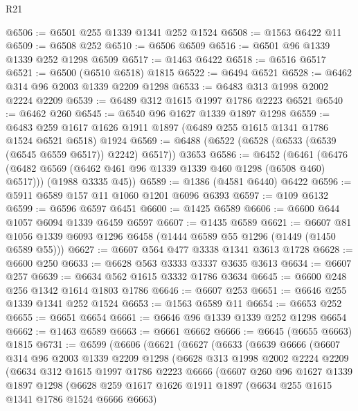 \begin{lexlean}{R21}
\begin{coremodule}
@6506 := @6501 @255 @1339 @1341 @252 @1524
@6508 := @1563 @6422 @11
@6509 := @6508 @252
@6510 := @6506 @6509
@6516 := @6501 @96 @1339 @1339 @252 @1298 @6509
@6517 := @1463 @6422
@6518 := @6516 @6517
@6521 := @6500 (@6510 @6518) @1815
@6522 := @6494 @6521
@6528 := @6462 @314 @96 @2003 @1339 @2209 @1298
@6533 := @6483 @313 @1998 @2002 @2224 @2209
@6539 := @6489 @312 @1615 @1997 @1786 @2223 @6521
@6540 := @6462 @260
@6545 := @6540 @96 @1627 @1339 @1897 @1298
@6559 := @6483 @259 @1617 @1626 @1911 @1897 (@6489 @255 @1615 @1341 @1786 @1524 @6521 @6518) @1924
@6569 := @6488 (@6522 (@6528 (@6533 (@6539 (@6545 @6559 @6517)) @2242) @6517)) @3653
@6586 := @6452
    (@6461
      (@6476 (@6482 @6569 (@6462 @461 @96 @1339 @1339 @460 @1298 (@6508 @460) @6517)))
      (@1988 @3335 @45))
@6589 := @1386 (@4581 @6440) @6422
@6596 := @5911 @6589 @157 @11 @1060 @1201 @6096 @6393
@6597 := @109 @6132
@6599 := @6596 @6597 @6451
@6600 := @1425 @6589
@6606 := @6600 @644 @1057 @6094 @1339 @6459 @6597
@6607 := @1435 @6589
@6621 := @6607 @81 @1056 @1339 @6093 @1296 @6458 (@1444 @6589 @55 @1296 (@1449 (@1450 @6589 @55)))
@6627 := @6607 @564 @477 @3338 @1341 @3613 @1728
@6628 := @6600 @250
@6633 := @6628 @563 @3333 @3337 @3635 @3613
@6634 := @6607 @257
@6639 := @6634 @562 @1615 @3332 @1786 @3634
@6645 := @6600 @248 @256 @1342 @1614 @1803 @1786
@6646 := @6607 @253
@6651 := @6646 @255 @1339 @1341 @252 @1524
@6653 := @1563 @6589 @11
@6654 := @6653 @252
@6655 := @6651 @6654
@6661 := @6646 @96 @1339 @1339 @252 @1298 @6654
@6662 := @1463 @6589
@6663 := @6661 @6662
@6666 := @6645 (@6655 @6663) @1815
@6731 := @6599
    (@6606
      (@6621
        (@6627
          (@6633
            (@6639
              @6666
              (@6607
                @314
                @96
                @2003
                @1339
                @2209
                @1298
                (@6628
                  @313
                  @1998
                  @2002
                  @2224
                  @2209
                  (@6634
                    @312
                    @1615
                    @1997
                    @1786
                    @2223
                    @6666
                    (@6607
                      @260
                      @96
                      @1627
                      @1339
                      @1897
                      @1298
                      (@6628
                        @259
                        @1617
                        @1626
                        @1911
                        @1897
                        (@6634 @255 @1615 @1341 @1786 @1524 @6666 @6663)

\end{coremodule}
\end{lexlean}
